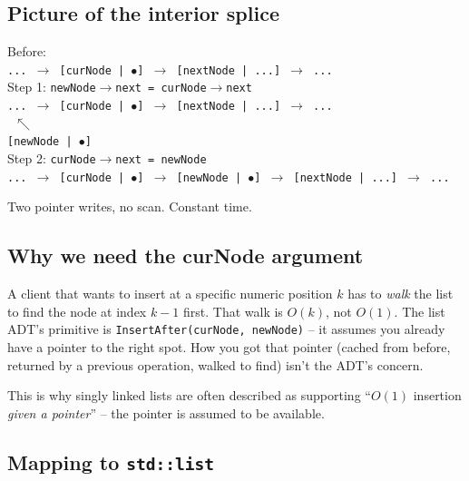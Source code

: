 \documentclass[11pt]{article}
\begin{document}
\subsection*{Picture of the interior splice}

\begin{center}
\footnotesize
Before:\\
\texttt{... $\to$ [curNode | $\bullet$] $\to$ [nextNode | ...] $\to$ ...}
\\[0.5em]
Step 1: \texttt{newNode$\to$next = curNode$\to$next}\\
\texttt{... $\to$ [curNode | $\bullet$] $\to$ [nextNode | ...] $\to$ ...}\\
\texttt{\phantom{... $\to$ [curNode | $\bullet$]\ }\ $\nwarrow$}\\
\texttt{\phantom{... $\to$ }[newNode | $\bullet$]}
\\[0.5em]
Step 2: \texttt{curNode$\to$next = newNode}\\
\texttt{... $\to$ [curNode | $\bullet$] $\to$ [newNode | $\bullet$] $\to$ [nextNode | ...] $\to$ ...}
\end{center}

Two pointer writes, no scan. Constant time.

\subsection{Why we need the curNode argument}

\begin{ideabox}
A client that wants to insert at a specific numeric position $k$
has to \emph{walk} the list to find the node at index $k - 1$ first.
That walk is $O(k)$, not $O(1)$. The list ADT's primitive is
\texttt{InsertAfter(curNode, newNode)} -- it assumes you already
have a pointer to the right spot. How you got that pointer (cached
from before, returned by a previous operation, walked to find)
isn't the ADT's concern.

This is why singly linked lists are often described as supporting
``$O(1)$ insertion \emph{given a pointer}'' -- the pointer is
assumed to be available.
\end{ideabox}

\subsection{Mapping to \texttt{std::list}}
\end{document}
